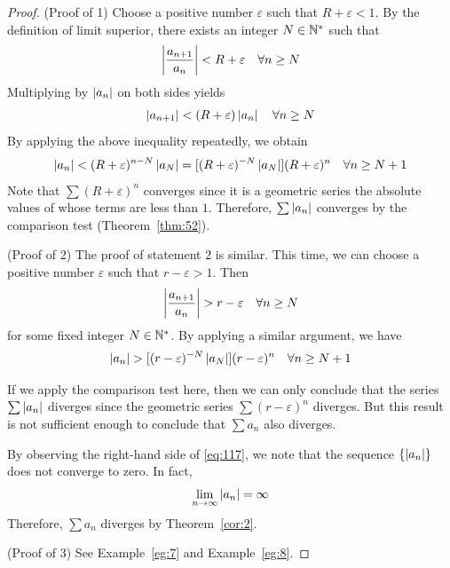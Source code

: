 \documentclass[thmcnt=section, 12pt]{my-elegantbook}
\begin{document}
\begin{proof}
    (Proof of 1) Choose a positive number $\varepsilon$ such that $R + \varepsilon < 1$. By the definition of limit superior, there exists an integer $N \in \mathbb{N}^\ast$ such that
    \begin{align*}
        \left\lvert \frac{a_{n+1}}{a_n} \right\rvert < R + \varepsilon
        \quad \forall n \geq N
    \end{align*}
    Multiplying by $\left\lvert a_n \right\rvert$ on both sides yields
    \begin{align*}
        \left\lvert a_{n+1} \right\rvert < (R + \varepsilon) \left\lvert a_n \right\rvert
        \quad \forall n \geq N
    \end{align*}
    By applying the above inequality repeatedly, we obtain
    \begin{align*}
        \left\lvert a_n \right\rvert < (R+\varepsilon)^{n-N} \left\lvert a_N \right\rvert
        = [(R+\varepsilon)^{-N} \left\lvert a_N \right\rvert] (R+\varepsilon)^n
        \quad \forall n \geq N+1
    \end{align*}
    Note that $\sum (R+\varepsilon)^n$ converges since it is a geometric series the absolute values of whose terms are less than $1$. Therefore, $\sum \left\lvert a_n \right\rvert$ converges by the comparison test (Theorem~\ref{thm:52}).

    (Proof of 2) The proof of statement 2 is similar. This time, we can choose a positive number $\varepsilon$ such that $r-\varepsilon > 1$. Then
    \begin{align*}
        \left\lvert \frac{a_{n+1}}{a_n} \right\rvert > r - \varepsilon
        \quad \forall n \geq N
    \end{align*}
    for some fixed integer $N \in \mathbb{N}^\ast$. By applying a similar argument, we have
    \begin{align}
        \left\lvert a_n \right\rvert > [(r-\varepsilon)^{-N} \left\lvert a_N \right\rvert] (r-\varepsilon)^n
        \quad \forall n \geq N+1
        \label{eq:117}
    \end{align}
    \begin{note}
        If we apply the comparison test here, then we can only conclude that the series $\sum \left\lvert a_n \right\rvert$ diverges since the geometric series $\sum (r-\varepsilon)^n$ diverges. But this result is not sufficient enough to conclude that $\sum a_n$ also diverges.
    \end{note}
    \noindent By observing the right-hand side of \eqref{eq:117}, we note that the sequence $\{\left\lvert a_n \right\rvert\}$ does not converge to zero. In fact,
    \begin{align*}
        \lim_{n \to \infty} \left\lvert a_n \right\rvert = \infty
    \end{align*}
    Therefore, $\sum a_n$ diverges by Theorem~\ref{cor:2}.

    (Proof of 3) See Example~\ref{eg:7} and Example~\ref{eg:8}.
\end{proof}
\end{document}
